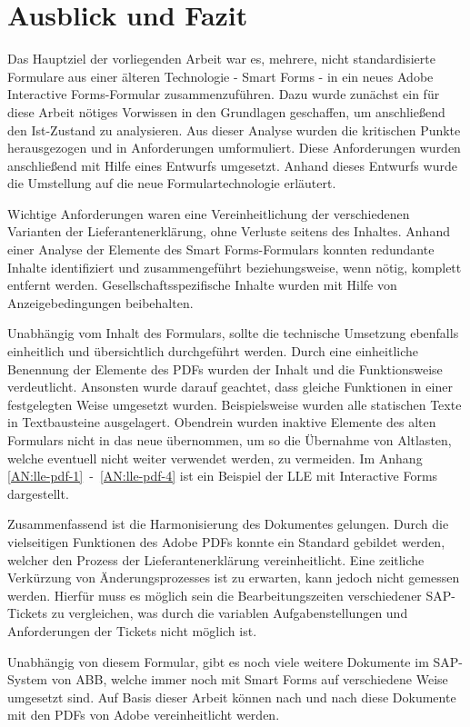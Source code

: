\chapter{Ausblick und Fazit}
\label{ch:Ausblick}

Das Hauptziel der vorliegenden Arbeit war es, mehrere, nicht standardisierte Formulare aus einer älteren Technologie - Smart Forms - in ein neues Adobe Interactive Forms-Formular zusammenzuführen. Dazu wurde zunächst ein für diese Arbeit nötiges Vorwissen in den Grundlagen geschaffen, um anschließend den Ist-Zustand zu analysieren. Aus dieser Analyse wurden die kritischen Punkte herausgezogen und in Anforderungen umformuliert. Diese Anforderungen wurden anschließend mit Hilfe eines Entwurfs umgesetzt. Anhand dieses Entwurfs wurde die Umstellung auf die neue Formulartechnologie erläutert.

Wichtige Anforderungen waren eine Vereinheitlichung der verschiedenen Varianten der Lieferantenerklärung, ohne Verluste seitens des Inhaltes. Anhand einer Analyse der Elemente des Smart Forms-Formulars konnten redundante Inhalte identifiziert und zusammengeführt beziehungsweise, wenn nötig, komplett entfernt werden. Gesellschaftsspezifische Inhalte wurden mit Hilfe von Anzeigebedingungen beibehalten.

Unabhängig vom Inhalt des Formulars, sollte die technische Umsetzung ebenfalls einheitlich und übersichtlich durchgeführt werden. Durch eine einheitliche Benennung der Elemente des \ac{PDF}s wurden der Inhalt und die Funktionsweise verdeutlicht. Ansonsten wurde darauf geachtet, dass gleiche Funktionen in einer festgelegten Weise umgesetzt wurden. Beispielsweise wurden alle statischen Texte in Textbausteine ausgelagert. Obendrein wurden inaktive Elemente des alten Formulars nicht in das neue übernommen, um so die Übernahme von Altlasten, welche eventuell nicht weiter verwendet werden, zu vermeiden. Im Anhang \ref{AN:lle-pdf-1}~-~\ref{AN:lle-pdf-4} ist ein Beispiel der \ac{LLE} mit Interactive Forms dargestellt.

Zusammenfassend ist die Harmonisierung des Dokumentes gelungen. Durch die vielseitigen Funktionen des Adobe \ac{PDF}s konnte ein Standard gebildet werden, welcher den Prozess der Lieferantenerklärung vereinheitlicht. Eine zeitliche Verkürzung von Änderungsprozesses ist zu erwarten, kann jedoch nicht gemessen werden. Hierfür muss es möglich sein die Bearbeitungszeiten verschiedener SAP-Tickets zu vergleichen, was durch die variablen Aufgabenstellungen und Anforderungen der Tickets nicht möglich ist.

Unabhängig von diesem Formular, gibt es noch viele weitere Dokumente im SAP-System von \ac{ABB}, welche immer noch mit Smart Forms auf verschiedene Weise umgesetzt sind. Auf Basis dieser Arbeit können nach und nach diese Dokumente mit den \ac{PDF}s von Adobe vereinheitlicht werden.

 
